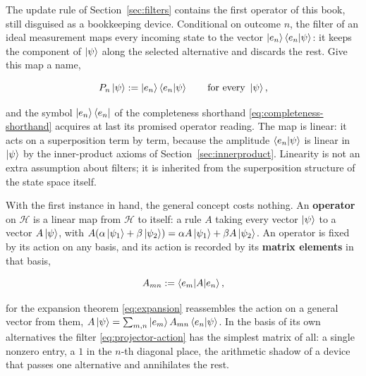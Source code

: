 The update rule of Section~\ref{sec:filters} contains the first operator of this book, still disguised as a bookkeeping device. Conditional on outcome $n$, the filter of an ideal measurement maps every incoming state to the vector $\ket{e_n}\braket{e_n|\psi}$: it keeps the component of $\ket{\psi}$ along the selected alternative and discards the rest. Give this map a name,
\begin{linenomath}
    \begin{equation}
        P_n\ket{\psi} := \ket{e_n}\braket{e_n|\psi}
        \qquad\text{for every }\ket{\psi},
        \label{eq:projector-action}
    \end{equation}
\end{linenomath}
and the symbol $\ket{e_n}\bra{e_n}$ of the completeness shorthand \eqref{eq:completeness-shorthand} acquires at last its promised operator reading. The map is linear: it acts on a superposition term by term, because the amplitude $\braket{e_n|\psi}$ is linear in $\ket{\psi}$ by the inner-product axioms of Section~\ref{sec:innerproduct}. Linearity is not an extra assumption about filters; it is inherited from the superposition structure of the state space itself.

With the first instance in hand, the general concept costs nothing. An \textbf{operator} on $\mathcal{H}$ is a linear map from $\mathcal{H}$ to itself: a rule $A$ taking every vector $\ket{\psi}$ to a vector $A\ket{\psi}$, with $A(\alpha\ket{\psi_1}+\beta\ket{\psi_2}) = \alpha A\ket{\psi_1} + \beta A\ket{\psi_2}$. An operator is fixed by its action on any basis, and its action is recorded by its \textbf{matrix elements} in that basis,
\begin{linenomath}
    \begin{equation}
        A_{mn} := \braket{e_m|A|e_n},
        \label{eq:matrix-elements}
    \end{equation}
\end{linenomath}
for the expansion theorem \eqref{eq:expansion} reassembles the action on a general vector from them, $A\ket{\psi} = \sum_{m,n}\ket{e_m}A_{mn}\braket{e_n|\psi}$. In the basis of its own alternatives the filter \eqref{eq:projector-action} has the simplest matrix of all: a single nonzero entry, a $1$ in the $n$-th diagonal place, the arithmetic shadow of a device that passes one alternative and annihilates the rest.

